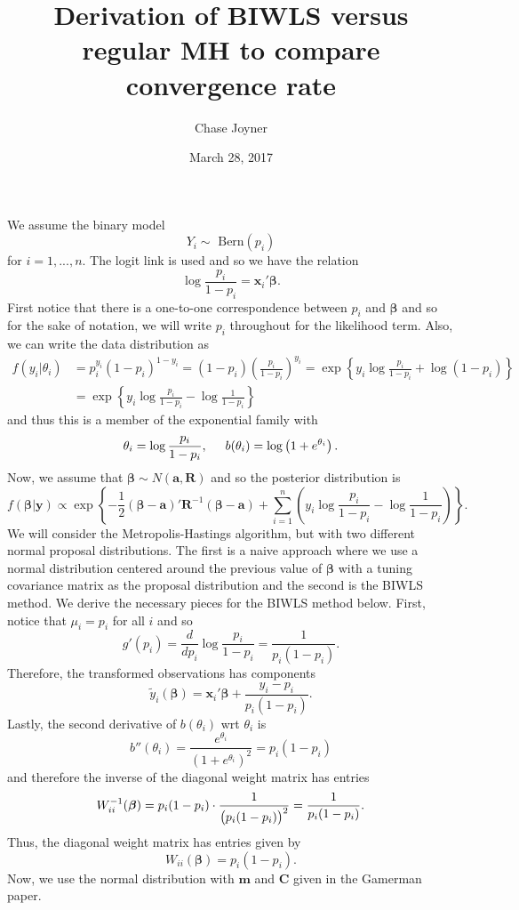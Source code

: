 \documentclass[12pt]{extarticle}
\title{Derivation of BIWLS versus regular MH to compare convergence rate}
\author{Chase Joyner}
\date{March 28, 2017}
\begin{document}
\maketitle
\noindent We assume the binary model
\[
Y_i \sim \text{ Bern}(p_i)
\]
for $i=1,...,n$.  The logit link is used and so we have the relation
\[
\log \frac{p_i}{1-p_i} = \mathbf{x}_i'\bm\beta.
\]
First notice that there is a one-to-one correspondence between $p_i$ and $\bm\beta$ and so for the sake of notation, we will write $p_i$ throughout for the likelihood term.  Also, we can write the data distribution as
\begin{align*}
f(y_i|\theta_i) &= p_i^{y_i}(1-p_i)^{1-y_i} = (1-p_i)\left(\frac{p_i}{1-p_i}\right)^{y_i} = \exp\left\{y_i\log\frac{p_i}{1-p_i} + \log(1-p_i)\right\} \\
&= \exp\left\{y_i\log\frac{p_i}{1-p_i} - \log\frac{1}{1-p_i}\right\}
\end{align*}
and thus this is a member of the exponential family with
\[
\theta_i = \log \frac{p_i}{1-p_i}, \hspace{5mm} b(\theta_i) = \log\left(1 + e^{\theta_i}\right). 
\]
Now, we assume that $\bm\beta\sim N(\mathbf{a},\mathbf{R})$ and so the posterior distribution is
\[
f(\bm\beta|\mathbf{y}) \propto \exp\left\{-\frac{1}{2}(\bm\beta - \textbf{a})'\textbf{R}^{-1}(\bm\beta  - \textbf{a}) + \sum_{i=1}^n\left(y_i\log\frac{p_i}{1-p_i} - \log\frac{1}{1-p_i}\right) \right\}.
\]
We will consider the Metropolis-Hastings algorithm, but with two different normal proposal distributions.  The first is a naive approach where we use a normal distribution centered around the previous value of $\bm\beta$ with a tuning covariance matrix as the proposal distribution and the second is the BIWLS method.  We derive the necessary pieces for the BIWLS method below.  First, notice that $\mu_i = p_i$ for all $i$ and so
\[
g'(p_i) = \frac{d}{dp_i}\log\frac{p_i}{1-p_i} = \frac{1}{p_i(1-p_i)}.
\]
Therefore, the transformed observations has components
\[
\widetilde{y}_i(\bm\beta) = \mathbf{x}_i'\bm\beta + \frac{y_i-p_i}{p_i(1-p_i)}.
\]
Lastly, the second derivative of $b(\theta_i)$ wrt $\theta_i$ is
\[
b''(\theta_i) = \frac{e^{\theta_i}}{(1+e^{\theta_i})^2} = p_i(1-p_i)
\]
and therefore the inverse of the diagonal weight matrix has entries
\[
W^{-1}_{ii}(\bm\beta) = p_i(1-p_i)\cdot \frac{1}{\big{(}p_i(1-p_i)\big{)}^2} = \frac{1}{p_i(1-p_i)}.
\]
Thus, the diagonal weight matrix has entries given by
\[
W_{ii}(\bm\beta) = p_i(1-p_i).
\]
Now, we use the normal distribution with $\textbf{m}$ and $\textbf{C}$ given in the Gamerman paper.
\end{document}
